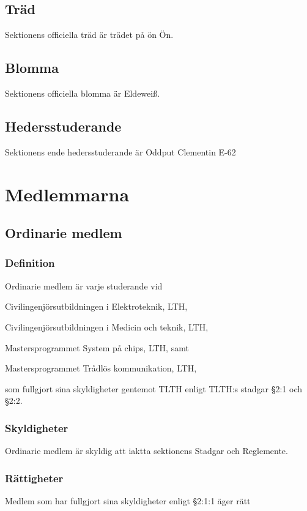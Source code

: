 \documentclass[10pt]{article}
\begin{document}
\subsection{Träd}
Sektionens officiella träd är trädet på ön Ön.
\subsection{Blomma}
Sektionens officiella blomma är Eldewei\ss.
\subsection{Hedersstuderande}
Sektionens ende hedersstuderande är Oddput Clementin E-62
\newpage

\section{Medlemmarna}
\subsection{Ordinarie medlem}
\subsubsection{Definition}
Ordinarie medlem är varje studerande vid
\begin{dashlist}
\item Civilingenjörsutbildningen i Elektroteknik, LTH,
\item Civilingenjörsutbildningen i Medicin och teknik, LTH,
\item Mastersprogrammet System på chips, LTH, samt
\item Mastersprogrammet Trådlös kommunikation, LTH,
\end{dashlist}
som fullgjort sina skyldigheter gentemot TLTH enligt TLTH:s stadgar §2:1 och §2:2.

\subsubsection{Skyldigheter}
Ordinarie medlem är skyldig att iaktta sektionens
Stadgar och Reglemente.

\subsubsection{Rättigheter}
Medlem som har fullgjort sina skyldigheter enligt
§2:1:1 äger rätt
\end{document}

